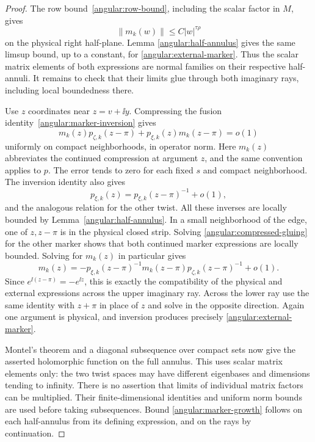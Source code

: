 \begin{proof}
The row bound~\eqref{angular:row-bound}, including the scalar factor
in $M$, gives
\[
 \|m_k(w)\|\le C|w|^{\tau\rho}
\]
on the physical right half-plane.  Lemma
\ref{angular:half-annulus} gives the same limsup bound, up to a
constant, for \eqref{angular:external-marker}.  Thus the scalar
matrix elements of both expressions are normal families on their
respective half-annuli.  It remains to check that their limits glue
through both imaginary rays, including local boundedness there.

Use $z$ coordinates near $z=v+\ii y$.  Compressing the fusion
identity~\eqref{angular:marker-inversion} gives
\begin{equation}\label{angular:compressed-gluing}
 m_k(z)p_{\zeta,k}(z-\pi)
 +p_{\xi,k}(z)m_k(z-\pi)=o(1)
\end{equation}
uniformly on compact neighborhoods, in operator norm.  Here $m_k(z)$
abbreviates the continued compression at argument $z$, and the same
convention applies to $p$.  The error tends to zero for each fixed
$s$ and compact neighborhood.  The inversion identity also gives
\[
 p_{\xi,k}(z)=p_{\xi,k}(z-\pi)^{-1}+o(1),
\]
and the analogous relation for the other twist.  All these inverses
are locally bounded by Lemma~\ref{angular:half-annulus}.  In a small
neighborhood of the edge, one of $z,z-\pi$ is in the physical closed
strip.  Solving \eqref{angular:compressed-gluing} for the other marker
shows that both continued marker expressions are locally bounded.
Solving for $m_k(z)$ in particular gives
\[
 m_k(z)=
 -p_{\xi,k}(z-\pi)^{-1}m_k(z-\pi)
  p_{\zeta,k}(z-\pi)^{-1}+o(1).
\]
Since $e^{\ii(z-\pi)}=-e^{\ii z}$, this is exactly the compatibility
of the physical and external expressions across the upper imaginary
ray.  Across the lower ray use the same identity with $z+\pi$ in
place of $z$ and solve in the opposite direction.  Again one argument
is physical, and inversion produces precisely
\eqref{angular:external-marker}.

Montel's theorem and a diagonal subsequence over compact sets now
give the asserted holomorphic function on the full annulus.  This
uses scalar matrix elements only: the two twist spaces may have
different eigenbases and dimensions tending to infinity.  There is
no assertion that limits of individual matrix factors can be
multiplied.  Their finite-dimensional identities and uniform norm
bounds are used before taking subsequences.  Bound
\eqref{angular:marker-growth} follows on each half-annulus from its
defining expression, and on the rays by continuation.
\end{proof}


